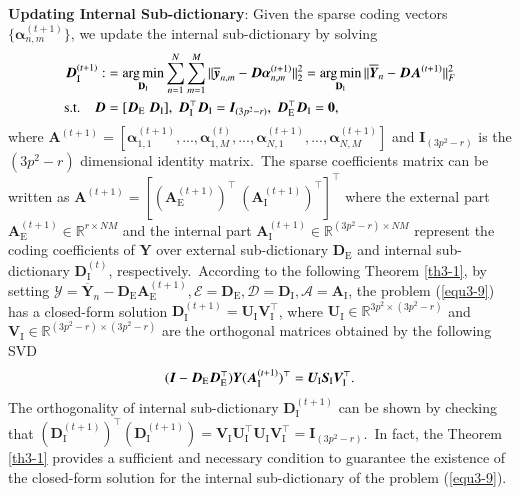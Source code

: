 \vspace{2mm}
\textbf{Updating Internal Sub-dictionary}: Given the sparse coding vectors $\{\bm{\alpha}_{n,m}^{(t+1)}\}$, we update the internal sub-dictionary by solving
\vspace{-2mm}
\begin{equation}\label{equ3-9}
\begin{split}
\bm{D}_{\text{I}}^{(t+1)}
:
&
=
\argmin_{\textbf{D}_{\text{I}}}
\sum_{n=1}^{N}\sum_{m=1}^{M}\|\bm{\overline{y}}_{n,m}-\bm{D}\bm{\alpha}_{n,m}^{(t+1)}\|_{2}^{2}
=
\argmin_{\textbf{D}_{\text{I}}}
\|\bm{\overline{Y}}_{n}-\bm{D}\bm{A}^{(t+1)}\|_{F}^{2}
\\
\text{s.t.}
\quad
\bm{D}
&
=
[\bm{D}_{\text{E}}\ \bm{D}_{\text{I}}],\ \bm{D}_{\text{I}}^{\top}\bm{D}_{\text{I}} = \bm{I}_{(3p^2-r)},\ \bm{D}_{\text{E}}^{\top}\bm{D}_{\text{I}} = \bm{0},
\end{split}
\end{equation}
where $\textbf{A}^{(t+1)}=[\bm{\alpha}_{1,1}^{(t+1)},...,\bm{\alpha}_{1,M}^{(t)},...,\bm{\alpha}_{N,1}^{(t+1)},...,\bm{\alpha}_{N,M}^{(t+1)}]$ and $\bm{I}_{(3p^2-r)}$ is the $(3p^2-r)$ dimensional identity matrix.\ The sparse coefficients matrix can be written as $\bm{A}^{(t+1)}=[(\bm{A}_{\text{E}}^{(t+1)})^{\top}\ (\bm{A}_{\text{I}}^{(t+1)})^{\top}]^{\top}$ where the external part $\bm{A}_{\text{E}}^{(t+1)}\in\mathbb{R}^{r\times NM}$ and the internal part $\bm{A}_{\text{I}}^{(t+1)}\in\mathbb{R}^{(3p^2-r)\times NM}$ represent the coding coefficients of $\bm{Y}$ over external sub-dictionary $\bm{D}_{\text{E}}$ and internal sub-dictionary $\bm{D}_{\text{I}}^{(t)}$, respectively.\ According to the following Theorem \ref{th3-1}, by setting $\mathcal{Y}=\bm{\overline{Y}}_{n}-\bm{D}_{\text{E}}\bm{A}_{\text{E}}^{(t+1)},\mathcal{E}=\bm{D}_{\text{E}},\mathcal{D}=\bm{D}_{\text{I}},\mathcal{A}=\bm{A}_{\text{I}}$, the problem (\ref{equ3-9}) has a closed-form solution $\bm{D}_{\text{I}}^{(t+1)}=\bm{U}_{\text{I}}\bm{V}_{\text{I}}^{\top}$, where $\bm{U}_{\text{I}}\in\mathbb{R}^{3p^2\times (3p^2-r)}$ and $\bm{V}_{\text{I}}\in\mathbb{R}^{(3p^2-r)\times (3p^2-r)}$ are the orthogonal matrices obtained by the following SVD \cite{eckart1936approximation}
\vspace{-1mm}
\begin{equation}\label{equ3-10}
\vspace{-1mm}
(\bm{I}-\bm{D}_{\text{E}}\bm{D}_{\text{E}}^{\top})\bm{Y}(\bm{A}_{\text{I}}^{(t+1)})^{\top}
=
\bm{U}_{\text{I}}\bm{S}_{\text{I}}\bm{V}_{\text{I}}^{\top}.
\end{equation}
The orthogonality of internal sub-dictionary $\bm{D}_{\text{I}}^{(t+1)}$ can be shown by checking that
$(\bm{D}_{\text{I}}^{(t+1)})^{\top}(\bm{D}_{\text{I}}^{(t+1)})=\bm{V}_{\text{I}}\bm{U}_{\text{I}}^{\top}\bm{U}_{\text{I}}\bm{V}_{\text{I}}^{\top}=\bm{I}_{(3p^2-r)}$.\ In fact, the Theorem \ref{th3-1} provides a sufficient and necessary condition to guarantee the existence of the closed-form solution for the internal sub-dictionary of the problem (\ref{equ3-9}).

